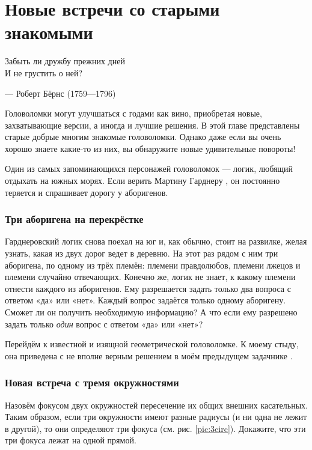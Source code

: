 \chapter{Новые встречи со старыми знакомыми}

\setlength{\epigraphwidth}{.53\textwidth}
\epigraph{Забыть ли дружбу прежних дней\\
И не грустить о ней?}{--- Роберт Бёрнс (1759---1796)}

Головоломки могут улучшаться с годами как вино, приобретая новые, захватывающие версии, а иногда и лучшие решения.
В этой главе представлены старые добрые многим знакомые головоломки.
Однако даже если вы очень хорошо знаете какие-то из них, 
вы обнаружите новые удивительные повороты!

Один из самых запоминающихся персонажей головоломок --- логик, любящий отдыхать на южных морях.
Если верить Мартину Гарднеру \cite{27}, он постоянно теряется и спрашивает дорогу у аборигенов.

\subsection*{Три аборигена на перекрёстке}

Гарднеровский логик снова поехал на юг и, как обычно, стоит на развилке, желая узнать,  какая из двух дорог ведет в деревню.
На этот раз рядом с ним три аборигена, по одному из трёх племён:
племени правдолюбов,
племени лжецов
и племени случайно отвечающих.
Конечно же, логик не знает, к какому племени отнести каждого из аборигенов.
Ему разрешается задать только два вопроса с ответом «да» или «нет».
Каждый вопрос задаётся только одному аборигену.
Сможет ли он получить необходимую информацию?
А что если ему разрешено задать только \emph{один} вопрос с ответом «да» или «нет»?

\medskip

Перейдём к известной и изящной геометрической головоломке.
К моему стыду, она приведена с не вполне верным решением в моём предыдущем задачнике \cite{59}.

\subsection*{Новая встреча с тремя окружностями}

Назовём фокусом двух окружностей пересечение их общих внешних касательных.
Таким образом, если три окружности имеют разные радиусы (и ни одна не лежит в другой), то они определяют три фокуса (см. рис. \ref{pic:3circ}).
Докажите, что эти три фокуса лежат на одной прямой.

